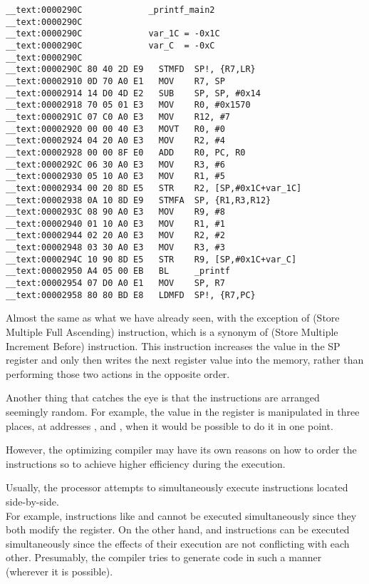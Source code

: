 \myparagraph{\OptimizingXcodeIV: \ARMMode}

\begin{lstlisting}[style=customasmARM]
__text:0000290C             _printf_main2
__text:0000290C
__text:0000290C             var_1C = -0x1C
__text:0000290C             var_C  = -0xC
__text:0000290C
__text:0000290C 80 40 2D E9   STMFD  SP!, {R7,LR}
__text:00002910 0D 70 A0 E1   MOV    R7, SP
__text:00002914 14 D0 4D E2   SUB    SP, SP, #0x14
__text:00002918 70 05 01 E3   MOV    R0, #0x1570
__text:0000291C 07 C0 A0 E3   MOV    R12, #7
__text:00002920 00 00 40 E3   MOVT   R0, #0
__text:00002924 04 20 A0 E3   MOV    R2, #4
__text:00002928 00 00 8F E0   ADD    R0, PC, R0
__text:0000292C 06 30 A0 E3   MOV    R3, #6
__text:00002930 05 10 A0 E3   MOV    R1, #5
__text:00002934 00 20 8D E5   STR    R2, [SP,#0x1C+var_1C]
__text:00002938 0A 10 8D E9   STMFA  SP, {R1,R3,R12}
__text:0000293C 08 90 A0 E3   MOV    R9, #8
__text:00002940 01 10 A0 E3   MOV    R1, #1
__text:00002944 02 20 A0 E3   MOV    R2, #2
__text:00002948 03 30 A0 E3   MOV    R3, #3
__text:0000294C 10 90 8D E5   STR    R9, [SP,#0x1C+var_C]
__text:00002950 A4 05 00 EB   BL     _printf
__text:00002954 07 D0 A0 E1   MOV    SP, R7
__text:00002958 80 80 BD E8   LDMFD  SP!, {R7,PC}
\end{lstlisting}

Almost the same as what we have already seen, with the
exception of  (Store Multiple Full Ascending) instruction, which is a synonym of  (Store Multiple Increment Before) instruction. 
This instruction increases the value in the \ac{SP} register and only then writes the next register value into the memory, rather than performing those two actions in the opposite order.

Another thing that catches the eye is that the instructions are arranged seemingly random.
For example, the value in the  register is manipulated in three
places, at addresses ,  and , when it would be possible to do it in one point.

However, the optimizing compiler may have its own reasons on how to order the instructions so to achieve higher efficiency during the execution.

Usually, the processor attempts to simultaneously execute instructions located side-by-side.\\
For example, instructions like  and
 cannot be executed simultaneously since they both modify the  register. 
On the other hand,  and  
instructions can be executed
simultaneously since the effects of their execution are not conflicting with each other.
Presumably, the compiler tries to generate code in such a manner (wherever it is possible).
 
